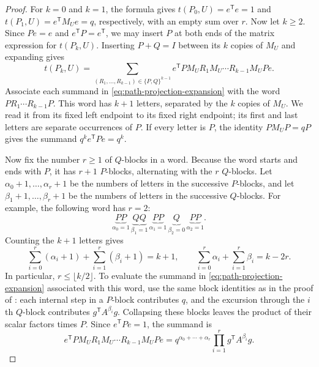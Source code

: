 \documentclass[11pt]{article}
\numberwithin{equation}{section}
\newcommand{\tP}[2]{t(P_{#1},#2)}
\begin{document}
\begin{proof}
  For $k=0$ and $k=1$, the formula gives $\tP0U=e^{\mathsf T}e=1$ and
  $\tP1U=e^{\mathsf T}M_Ue=q$, respectively, with an empty sum over $r$.
  Now let $k\ge2$. Since $Pe=e$ and $e^{\mathsf T}P=e^{\mathsf T}$,
  we may insert $P$ at both ends of the matrix expression for $\tP kU$.
  Inserting $P+Q=I$ between its $k$ copies of $M_U$ and expanding gives
  \begin{equation}\label{eq:path-projection-expansion}
    \tP kU=
    \sum_{(R_1,\ldots,R_{k-1})\in\{P,Q\}^{k-1}}
      e^{\mathsf T}P M_U R_1M_U\cdots R_{k-1}M_UPe.
  \end{equation}
  Associate each summand in \eqref{eq:path-projection-expansion} with
  the word $PR_1\cdots R_{k-1}P$.
  This word has $k+1$ letters, separated by the $k$ copies of $M_U$.
  We read it from its fixed left endpoint to its fixed right endpoint;
  its first and last letters are separate occurrences of $P$.
  If every letter is $P$, the identity $P M_U P=qP$ gives the summand
  $q^k e^{\mathsf T}Pe=q^k$.

  Now fix the number $r\ge1$ of $Q$-blocks in a word.
  Because the word starts and ends with $P$, it has $r+1$ $P$-blocks,
  alternating with the $r$ $Q$-blocks. Let
  $\alpha_0+1,\ldots,\alpha_r+1$ be the numbers of letters in the
  successive $P$-blocks, and let $\beta_1+1,\ldots,\beta_r+1$ be the
  numbers of letters in the successive $Q$-blocks.  For example, the
  following word has $r=2$:
  \[
    \underbrace{PP}_{\alpha_0=1}\,
    \underbrace{QQ}_{\beta_1=1}\,
    \underbrace{PP}_{\alpha_1=1}\,
    \underbrace{Q}_{\beta_2=0}\,
    \underbrace{PP}_{\alpha_2=1}.
  \]
  Counting the $k+1$ letters gives
  \[
    \sum_{i=0}^r(\alpha_i+1)+\sum_{i=1}^r(\beta_i+1)=k+1,
    \qquad
    \sum_{i=0}^r\alpha_i+\sum_{i=1}^r\beta_i=k-2r.
  \]
  In particular, $r\le\lfloor k/2\rfloor$.
  To evaluate the summand in \eqref{eq:path-projection-expansion}
  associated with this word, use the same block identities as in the proof
  of : each internal step in a $P$-block
  contributes $q$, and the excursion through the $i$th $Q$-block
  contributes $g^{\mathsf T}A^{\beta_i}g$.
  Collapsing these blocks leaves the product of their scalar factors
  times $P$. Since $e^{\mathsf T}Pe=1$, the summand is
  \[
    e^{\mathsf T}P M_U R_1M_U\cdots R_{k-1}M_UPe
    =q^{\alpha_0+\cdots+\alpha_r}
      \prod_{i=1}^rg^{\mathsf T}A^{\beta_i}g.
  \]


\end{proof}
\end{document}
